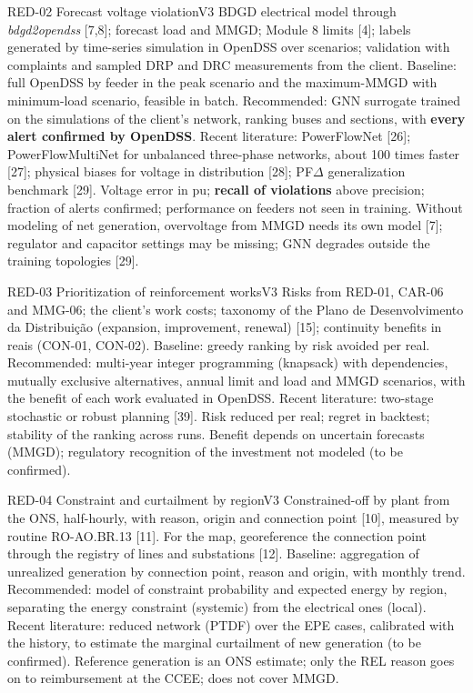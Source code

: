 \begin{ficha}{RED-02 \textperiodcentered{} Forecast voltage violation}{V3}
 BDGD electrical model through \emph{bdgd2opendss} [7,8]; forecast
load and MMGD; Module 8 limits [4]; labels generated by time-series
simulation in OpenDSS over scenarios; validation with complaints and sampled
DRP and DRC measurements from the client.
 Baseline: full OpenDSS by feeder in the
peak scenario and the maximum-MMGD with minimum-load scenario, feasible in batch.
Recommended: GNN surrogate trained on the simulations of the client's network,
ranking buses and sections, with \textbf{every alert confirmed by OpenDSS}.
Recent literature: PowerFlowNet [26]; PowerFlowMultiNet for unbalanced
three-phase networks, about 100 times faster [27]; physical biases for
voltage in distribution [28]; PF$\Delta$ generalization benchmark [29].
 Voltage error in pu; \textbf{recall of violations} above
precision; fraction of alerts confirmed; performance on feeders not
seen in training.
 Without modeling of net generation, overvoltage from MMGD
needs its own model [7]; regulator and capacitor settings may be
missing; GNN degrades outside the training topologies [29].
\end{ficha}

\begin{ficha}{RED-03 \textperiodcentered{} Prioritization of reinforcement works}{V3}
 Risks from RED-01, CAR-06 and MMG-06; the client's work costs;
taxonomy of the Plano de Desenvolvimento da Distribuição (expansion, improvement,
renewal) [15]; continuity benefits in reais (CON-01, CON-02).
 Baseline: greedy ranking by risk avoided per real.
Recommended: multi-year integer programming (knapsack) with dependencies,
mutually exclusive alternatives, annual limit and load and MMGD scenarios, with
the benefit of each work evaluated in OpenDSS. Recent literature: two-stage
stochastic or robust planning [39].
 Risk reduced per real; regret in backtest; stability of the
ranking across runs.
 Benefit depends on uncertain forecasts (MMGD);
regulatory recognition of the investment not modeled (to be confirmed).
\end{ficha}

\begin{ficha}{RED-04 \textperiodcentered{} Constraint and curtailment by region}{V3}
 Constrained-off by plant from the ONS, half-hourly, with reason,
origin and connection point [10], measured by routine RO-AO.BR.13 [11]. For the
map, georeference the connection point through the registry of lines and
substations [12].
 Baseline: aggregation of unrealized generation by
connection point, reason and origin, with monthly trend. Recommended: model
of constraint probability and expected energy by region, separating the
energy constraint (systemic) from the electrical ones (local). Recent literature:
reduced network (PTDF) over the EPE cases, calibrated with the history, to
estimate the marginal curtailment of new generation (to be confirmed).
 Reference generation is an ONS estimate; only the REL reason
goes on to reimbursement at the CCEE; does not cover MMGD.
\end{ficha}

